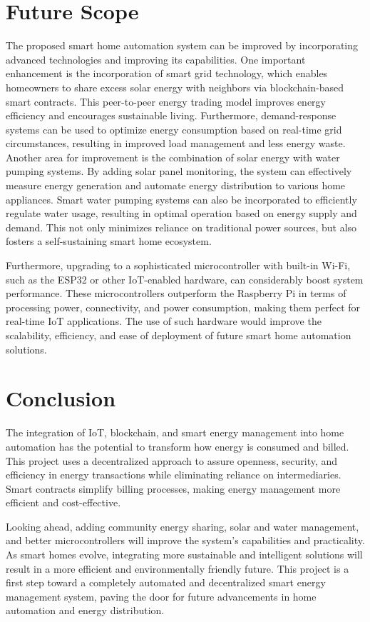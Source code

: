 \documentclass[a4paper,12pt]{report}
\begin{document}
\chapter{Future Scope}
The proposed smart home automation system can be improved by incorporating advanced technologies and improving its capabilities.  One important enhancement is the incorporation of smart grid technology, which enables homeowners to share excess solar energy with neighbors via blockchain-based smart contracts.  This peer-to-peer energy trading model improves energy efficiency and encourages sustainable living.  Furthermore, demand-response systems can be used to optimize energy consumption based on real-time grid circumstances, resulting in improved load management and less energy waste.
Another area for improvement is the combination of solar energy with water pumping systems.  By adding solar panel monitoring, the system can effectively measure energy generation and automate energy distribution to various home appliances.  Smart water pumping systems can also be incorporated to efficiently regulate water usage, resulting in optimal operation based on energy supply and demand.  This not only minimizes reliance on traditional power sources, but also fosters a self-sustaining smart home ecosystem.

Furthermore, upgrading to a sophisticated microcontroller with built-in Wi-Fi, such as the ESP32 or other IoT-enabled hardware, can considerably boost system performance.  These microcontrollers outperform the Raspberry Pi in terms of processing power, connectivity, and power consumption, making them perfect for real-time IoT applications.  The use of such hardware would improve the scalability, efficiency, and ease of deployment of future smart home automation solutions.


\chapter{Conclusion}
The integration of IoT, blockchain, and smart energy management into home automation has the potential to transform how energy is consumed and billed.  This project uses a decentralized approach to assure openness, security, and efficiency in energy transactions while eliminating reliance on intermediaries.  Smart contracts simplify billing processes, making energy management more efficient and cost-effective.

Looking ahead, adding community energy sharing, solar and water management, and better microcontrollers will improve the system's capabilities and practicality.  As smart homes evolve, integrating more sustainable and intelligent solutions will result in a more efficient and environmentally friendly future.  This project is a first step toward a completely automated and decentralized smart energy management system, paving the door for future advancements in home automation and energy distribution.


\newpage
\renewcommand{\bibname}{References}



\end{document}
